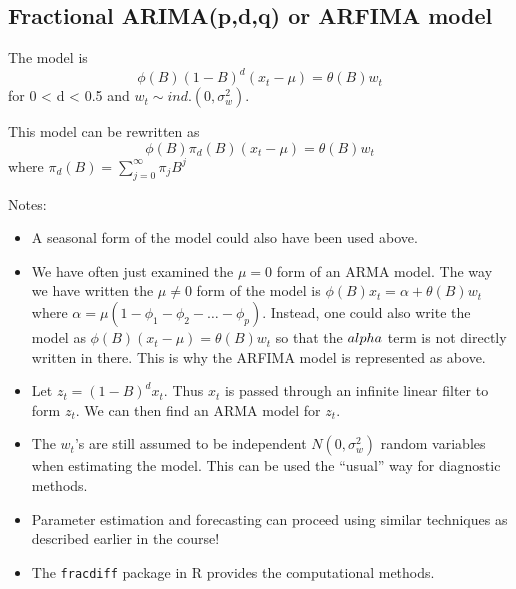 \documentclass[
]{book}
\theoremstyle{definition}
\theoremstyle{definition}
\theoremstyle{definition}
\theoremstyle{definition}
\theoremstyle{remark}
\begin{document}
\hypertarget{fractional-arimapdq-or-arfima-model}{%
\subsection{Fractional ARIMA(p,d,q) or ARFIMA model}\label{fractional-arimapdq-or-arfima-model}}

The model is \[\phi(B)(1-B)^d(x_t-\mu)=\theta(B)w_t\] for 0 \textless{} d \textless{} 0.5 and \(w_t\sim ind.(0, \sigma_w^2)\).

This model can be rewritten as \[\phi(B)\pi_d(B)(x_t-\mu)=\theta(B)w_t\] where \(\pi_d(B)=\sum_{j=0}^{\infty}\pi_jB^j\)

Notes:

\begin{itemize}
\item
  A seasonal form of the model could also have been used above.
\item
  We have often just examined the \(\mu = 0\) form of an ARMA model. The way we have written the \(\mu \ne 0\) form of the model is \(\phi(B)x_t = \alpha + \theta(B)w_t\) where \(\alpha = \mu(1-\phi_1-\phi_2-…-\phi_p)\). Instead, one could also write the model as \(\phi(B)(x_t-\mu) = \theta(B)w_t\) so that the \(\\alpha\) term is not directly written in there. This is why the ARFIMA model is represented as above.
\item
  Let \(z_t=(1-B)^dx_t\). Thus \(x_t\) is passed through an infinite linear filter to form \(z_t\). We can then find an ARMA model for \(z_t\).
\item
  The \(w_t\)'s are still assumed to be independent \(N(0, \sigma_w^2 )\) random variables when estimating the model. This can be used the ``usual'' way for diagnostic methods.
\item
  Parameter estimation and forecasting can proceed using similar techniques as described earlier in the course!
\item
  The \texttt{fracdiff} package in R provides the computational methods.
\end{itemize}
\end{document}
